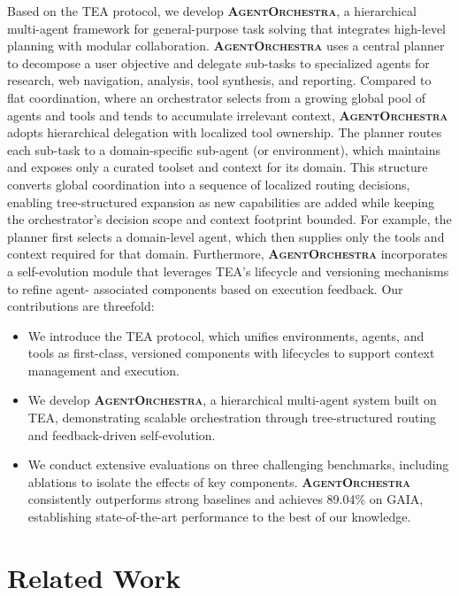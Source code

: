 \documentclass[11pt]{article}
\newcommand{\projectname}{\textbf{\textsc{AgentOrchestra}}\xspace}
\begin{document}
Based on the TEA protocol, we develop \projectname, a hierarchical multi-agent framework for general-purpose task solving that integrates high-level planning with modular collaboration. \projectname uses a central planner to decompose a user objective and delegate sub-tasks to specialized agents for research, web navigation, analysis, tool synthesis, and reporting. Compared to flat coordination, where an orchestrator selects from a growing global pool of agents and tools and tends to accumulate irrelevant context, \projectname adopts hierarchical delegation with localized tool ownership. The planner routes each sub-task to a domain-specific sub-agent (or environment), which maintains and exposes only a curated toolset and context for its domain. This structure converts global coordination into a sequence of localized routing decisions, enabling tree-structured expansion as new capabilities are added while keeping the orchestrator’s decision scope and context footprint bounded. For example, the planner first selects a domain-level agent, which then supplies only the tools and context required for that domain. Furthermore, \projectname incorporates a self-evolution module that leverages TEA’s lifecycle and versioning mechanisms to refine agent- associated components based on execution feedback. Our contributions are threefold:
\begin{itemize}[leftmargin=*,itemsep=0.1em]
\item We introduce the TEA protocol, which unifies environments, agents, and tools as first-class, versioned components with lifecycles to support context management and execution.
\item We develop \projectname, a hierarchical multi-agent system built on TEA, demonstrating scalable orchestration through tree-structured routing and feedback-driven self-evolution.
\item We conduct extensive evaluations on three challenging benchmarks, including ablations to isolate the effects of key components. \projectname consistently outperforms strong baselines and achieves 89.04\% on GAIA, establishing state-of-the-art performance to the best of our knowledge.
\end{itemize}

\section{Related Work}
\end{document}
